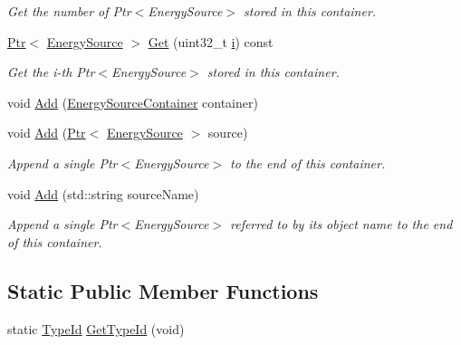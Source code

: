 \begin{DoxyCompactItemize}
\begin{DoxyCompactList}\small\item\em Get the number of Ptr$<$\+Energy\+Source$>$ stored in this container. \end{DoxyCompactList}\item 
\hyperlink{classns3_1_1Ptr}{Ptr}$<$ \hyperlink{classns3_1_1EnergySource}{Energy\+Source} $>$ \hyperlink{classns3_1_1EnergySourceContainer_ac59e8c3dc22ecb142f3398dcd23c5c37}{Get} (uint32\+\_\+t \hyperlink{lte__uplink__power__control_8m_a6f6ccfcf58b31cb6412107d9d5281426}{i}) const 
\begin{DoxyCompactList}\small\item\em Get the i-\/th Ptr$<$\+Energy\+Source$>$ stored in this container. \end{DoxyCompactList}\item 
void \hyperlink{classns3_1_1EnergySourceContainer_a8a2ee083f2b448ee87393b280b7407b9}{Add} (\hyperlink{classns3_1_1EnergySourceContainer}{Energy\+Source\+Container} container)
\item 
void \hyperlink{classns3_1_1EnergySourceContainer_a76284c816877bfcbf746765f4e4c85d2}{Add} (\hyperlink{classns3_1_1Ptr}{Ptr}$<$ \hyperlink{classns3_1_1EnergySource}{Energy\+Source} $>$ source)
\begin{DoxyCompactList}\small\item\em Append a single Ptr$<$\+Energy\+Source$>$ to the end of this container. \end{DoxyCompactList}\item 
void \hyperlink{classns3_1_1EnergySourceContainer_a1f068e5479eb340310465c765f10c969}{Add} (std\+::string source\+Name)
\begin{DoxyCompactList}\small\item\em Append a single Ptr$<$\+Energy\+Source$>$ referred to by its object name to the end of this container. \end{DoxyCompactList}\end{DoxyCompactItemize}
\subsection*{Static Public Member Functions}
\begin{DoxyCompactItemize}
\item 
static \hyperlink{classns3_1_1TypeId}{Type\+Id} \hyperlink{classns3_1_1EnergySourceContainer_a4e7b390e46c05c03d686c07145e82137}{Get\+Type\+Id} (void)
\end{DoxyCompactItemize}
